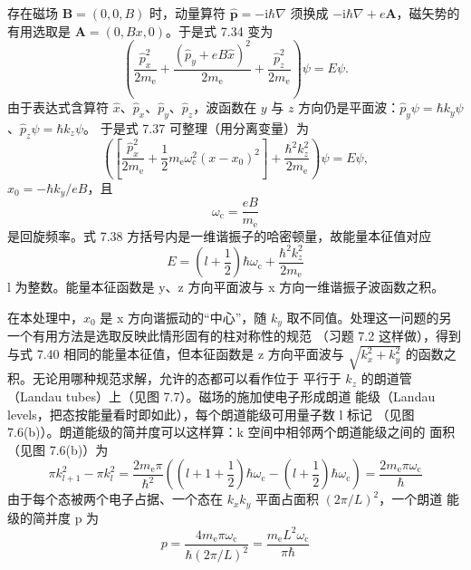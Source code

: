 存在磁场 $\mathbf{B}=(0,0,B)$ 时，动量算符 $\hat{\mathbf{p}}=-\mathrm{i}\hbar\nabla$
须换成 $-\mathrm{i}\hbar\nabla+e\mathbf{A}$，磁矢势的有用选取是
$\mathbf{A}=(0,Bx,0)$。于是式 7.34 变为
\begin{equation*}
\left(\frac{\hat{p}_x^{2}}{2m_{\mathrm{e}}} + \frac{(\hat{p}_y+eB\hat{x})^{2}}{2m_{\mathrm{e}}} + \frac{\hat{p}_z^{2}}{2m_{\mathrm{e}}}\right)\psi = E\psi.\tag{7.37}
\end{equation*}
由于表达式含算符 $\hat{x}$、$\hat{p}_x$、$\hat{p}_y$、$\hat{p}_z$，波函数在 $y$
与 $z$ 方向仍是平面波：$\hat{p}_y\psi=\hbar k_y\psi$、$\hat{p}_z\psi=\hbar k_z\psi$。
于是式 7.37 可整理（用分离变量）为
\begin{equation*}
\left(\left[\frac{\hat{p}_x^{2}}{2m_{\mathrm{e}}} + \frac{1}{2}m_{\mathrm{e}}\omega_{\mathrm{c}}^{2}(x-x_0)^{2}\right] + \frac{\hbar^{2}k_z^{2}}{2m_{\mathrm{e}}}\right)\psi = E\psi,\tag{7.38}
\end{equation*}
$x_0=-\hbar k_y/eB$，且
\begin{equation*}
\omega_{\mathrm{c}} = \frac{eB}{m_{\mathrm{e}}}\tag{7.39}
\end{equation*}
是回旋频率。式 7.38 方括号内是一维谐振子的哈密顿量，故能量本征值对应
\begin{equation*}
E = \left(l+\frac{1}{2}\right)\hbar\omega_{\mathrm{c}} + \frac{\hbar^{2}k_z^{2}}{2m_{\mathrm{e}}}\tag{7.40}
\end{equation*}
l 为整数。能量本征函数是 y、z 方向平面波与 x 方向一维谐振子波函数之积。

在本处理中，$x_0$ 是 x 方向谐振动的“中心”，随 $k_y$ 取不同值。处理这一问题的另一个有用方法是选取反映此情形固有的柱对称性的规范
（习题 7.2 这样做），得到与式 7.40 相同的能量本征值，但本征函数是 z 方向平面波与
$\sqrt{k_x^{2}+k_y^{2}}$ 的函数之积。无论用哪种规范求解，允许的态都可以看作位于
平行于 $k_z$ 的朗道管（Landau tubes）上（见图 7.7）。磁场的施加使电子形成朗道
能级（Landau levels，把态按能量看时即如此），每个朗道能级可用量子数 l 标记
（见图 7.6(b)）。朗道能级的简并度可以这样算：k 空间中相邻两个朗道能级之间的
面积（见图 7.6(b)）为
\begin{equation*}
\pi k_{l+1}^{2}-\pi k_l^{2} = \frac{2m_{\mathrm{e}}\pi}{\hbar^{2}}\left(\left(l+1+\frac{1}{2}\right)\hbar\omega_{\mathrm{c}}-\left(l+\frac{1}{2}\right)\hbar\omega_{\mathrm{c}}\right) = \frac{2m_{\mathrm{e}}\pi\omega_{\mathrm{c}}}{\hbar}\tag{7.41}
\end{equation*}
由于每个态被两个电子占据、一个态在 $k_xk_y$ 平面占面积 $(2\pi/L)^{2}$，一个朗道
能级的简并度 p 为
\begin{equation*}
p = \frac{4m_{\mathrm{e}}\pi\omega_{\mathrm{c}}}{\hbar(2\pi/L)^{2}} = \frac{m_{\mathrm{e}}L^{2}\omega_{\mathrm{c}}}{\pi\hbar}\tag{7.42}
\end{equation*}

